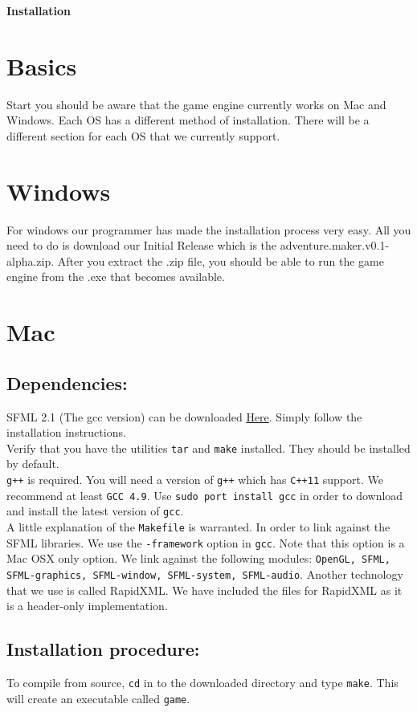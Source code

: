 \documentclass[11pt]{article}
\begin{document}
\begin{center}\huge \bf Installation
\end{center}

\section{Basics}

\indent \indent Start you should be aware that the game engine currently works on Mac and Windows. Each OS has a different method of installation. There will be a different section for each OS that we currently support.

\section{Windows}

\indent \indent  For windows our programmer has made the installation process very easy. All you need to do is download our Initial Release which is the adventure.maker.v0.1-alpha.zip. After you extract the .zip file, you should be able to run the game engine from the .exe that becomes available.

\section{Mac}
\subsection{Dependencies:}
    \indent \indent SFML 2.1 (The gcc version) can be downloaded
    \href{http://www.sfml-dev.org/download/sfml/2.1/}{Here}. Simply follow the installation instructions. \\
    \indent Verify that you have the utilities \texttt{tar} and \texttt{make} installed. 
    They should be installed by default. \\
    \indent \texttt{g++} is required. You will need a version of \texttt{g++} which has \texttt{C++11} support.
    We recommend at least \texttt{GCC 4.9}.
    Use \texttt{sudo port install gcc} in order to download and install the 
    latest version of \texttt{gcc}. \\
    \indent A little explanation of the \texttt{Makefile} is warranted. 
    In order to link against the SFML libraries.
    We use the \texttt{-framework} option in \texttt{gcc}. Note that this option is a Mac OSX only option.
    We link against the following modules: 
    \texttt{OpenGL, SFML, SFML-graphics, SFML-window, SFML-system, SFML-audio}.
    Another technology that we use is called RapidXML. We have included the files for RapidXML as it 
    is a header-only implementation.
    
    
\subsection{Installation procedure:}
    \indent \indent To compile from source, \texttt{cd} in to the downloaded directory and type \texttt{make}.
    This will create an executable called \texttt{game}.
    
\end{document}
